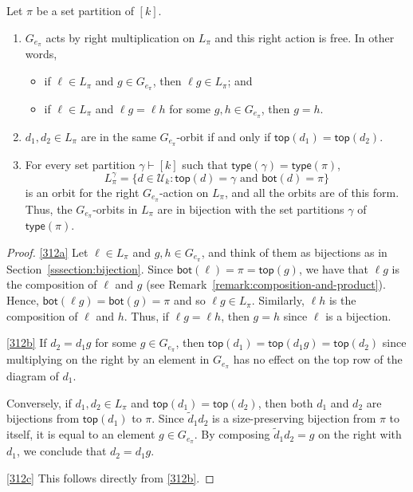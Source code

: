 \begin{prop}\label{prop:orbitreps}
Let $\pi$ be a set partition of $[k]$.
\begin{enumerate}[label=(\alph*)]
    \item\label{312a}
        $G_{e_\pi}$ acts by right multiplication on $L_\pi$
        and this right action is free. In other words,
        \begin{itemize}
            \item
                if $\ell \in L_\pi$ and $g \in G_{e_\pi}$, then $\ell g \in L_\pi$; and
            \item
                if $\ell \in L_\pi$ and $\ell g = \ell h$ for some $g, h \in G_{e_\pi}$, then $g = h$.
        \end{itemize}

    \item \label{312b}
        $d_1, d_2\in L_\pi$ are in the same $G_{e_\pi}$-orbit if and only if $\mathsf{top}(d_1) = \mathsf{top}(d_2)$.

    \item \label{312c}
        For every set partition $\gamma\vdash [k]$ such that $\mathsf{type}(\gamma) = \mathsf{type}(\pi)$,
        $$L_{\pi}^\gamma = \{d \in \mathcal{U}_k : \mathsf{top}(d) = \gamma \text{ and } \mathsf{bot}(d) = \pi\}$$
        is an orbit for the right $G_{e_\pi}$-action on $L_\pi$, and all the orbits are of this form.
        Thus, the $G_{e_\pi}$-orbits in $L_\pi$ are in bijection with the set partitions $\gamma$ of $\mathsf{type}(\pi)$.
\end{enumerate}
\end{prop}

\begin{proof}
   \ref{312a} Let $\ell \in L_\pi$ and $g, h \in G_{e_\pi}$, and think of them as bijections
    as in Section~\ref{sssection:bijection}.
    Since $\mathsf{bot}(\ell) = \pi = \mathsf{top}(g)$,
    we have that $\ell g$ is the composition of $\ell$ and $g$ (see Remark~\ref{remark:composition-and-product}).
    Hence, $\mathsf{bot}(\ell g) = \mathsf{bot}(g) = \pi$ and so $\ell g \in L_\pi$.
    Similarly, $\ell h$ is the composition of $\ell$ and $h$. Thus,
    if $\ell g = \ell h$, then $g = h$ since $\ell$ is a bijection.

    \ref{312b} If $d_2 = d_1 g$ for some $g \in G_{e_\pi}$, then $\mathsf{top}(d_1)
    = \mathsf{top}(d_1 g) = \mathsf{top}(d_2)$ since multiplying on the right
    by an element in $G_{e_\pi}$ has no effect on the top row of the diagram of $d_1$.

    Conversely, if $d_1, d_2 \in L_\pi$ and $\mathsf{top}(d_1)
    = \mathsf{top}(d_2)$, then both $d_1$ and $d_2$ are
    bijections from $\mathsf{top}(d_1)$ to $\pi$.
    Since $\widetilde{d}_1 d_2$ is a size-preserving bijection
    from $\pi$ to itself, it is equal to an element $g \in G_{e_\pi}$.
    By composing $\widetilde{d}_1 d_2 = g$ on the right with $d_1$,
    we conclude that $d_2 = d_1 g$.

    \ref{312c} This follows directly from \ref{312b}.
\end{proof}

